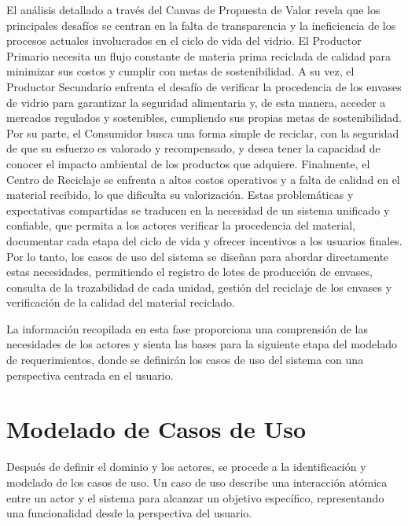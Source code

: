 El análisis detallado a través del Canvas de Propuesta de Valor revela que los principales desafíos se centran en la falta de transparencia y la ineficiencia de los procesos actuales involucrados en el ciclo de vida del vidrio. El Productor Primario necesita un flujo constante de materia prima reciclada de calidad para minimizar sus costos y cumplir con metas de sostenibilidad. A su vez, el Productor Secundario enfrenta el desafío de verificar la procedencia de los envases de vidrio para garantizar la seguridad alimentaria y, de esta manera, acceder a mercados regulados y sostenibles, cumpliendo sus propias metas de sostenibilidad. Por su parte, el Consumidor busca una forma simple de reciclar, con la seguridad de que su esfuerzo es valorado y recompensado, y desea tener la capacidad de conocer el impacto ambiental de los productos que adquiere. Finalmente, el Centro de Reciclaje se enfrenta a altos costos operativos y a falta de calidad en el material recibido, lo que dificulta su valorización. Estas problemáticas y expectativas compartidas se traducen en la necesidad de un sistema unificado y confiable, que permita a los actores verificar la procedencia del material, documentar cada etapa del ciclo de vida y ofrecer incentivos a los usuarios finales. Por lo tanto, los casos de uso del sistema se diseñan para abordar directamente estas necesidades, permitiendo el registro de lotes de producción de envases, consulta de la trazabilidad de cada unidad, gestión del reciclaje de los envases y verificación de la calidad del material reciclado.


La información recopilada en esta fase proporciona una comprensión de las necesidades de los actores y sienta las bases para la siguiente etapa del modelado de requerimientos, donde se definirán los casos de uso del sistema con una perspectiva centrada en el usuario.

\section{Modelado de Casos de Uso}
\label{sec:use-cases}

Después de definir el dominio y los actores, se procede a la identificación y modelado de los casos de uso. Un caso de uso describe una interacción atómica entre un actor y el sistema para alcanzar un objetivo específico, representando una funcionalidad desde la perspectiva del usuario.

